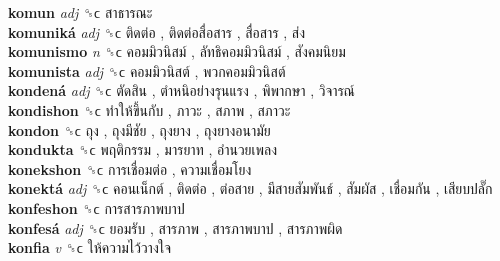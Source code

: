 \textbf{komun} \emph{adj}  ␝ϲ   สาธารณะ   \\
\textbf{komuniká} \emph{adj}  ␝ϲ   ติดต่อ ,  ติดต่อสื่อสาร ,  สื่อสาร ,  ส่ง   \\
\textbf{komunismo} \emph{n}  ␝ϲ   คอมมิวนิสม์ ,  ลัทธิคอมมิวนิสม์ ,  สังคมนิยม   \\
\textbf{komunista} \emph{adj}  ␝ϲ   คอมมิวนิสต์ ,  พวกคอมมิวนิสต์   \\
\textbf{kondená} \emph{adj}  ␝ϲ   ตัดสิน ,  ตำหนิอย่างรุนแรง ,  พิพากษา ,  วิจารณ์   \\
\textbf{kondishon} ␝ϲ   ทำให้ขึ้นกับ ,  ภาวะ ,  สภาพ ,  สภาวะ   \\
\textbf{kondon} ␝ϲ   ถุง ,  ถุงมีชัย ,  ถุงยาง ,  ถุงยางอนามัย   \\
\textbf{kondukta} ␝ϲ   พฤติกรรม ,  มารยาท ,  อำนวยเพลง   \\
\textbf{konekshon} ␝ϲ   การเชื่อมต่อ ,  ความเชื่อมโยง   \\
\textbf{konektá} \emph{adj}  ␝ϲ   คอนเน็กต์ ,  ติดต่อ ,  ต่อสาย ,  มีสายสัมพันธ์ ,  สัมผัส ,  เชื่อมกัน ,  เสียบปลั๊ก   \\
\textbf{konfeshon} ␝ϲ   การสารภาพบาป   \\
\textbf{konfesá} \emph{adj}  ␝ϲ   ยอมรับ ,  สารภาพ ,  สารภาพบาป ,  สารภาพผิด   \\
\textbf{konfia} \emph{v}  ␝ϲ   ให้ความไว้วางใจ   \\
